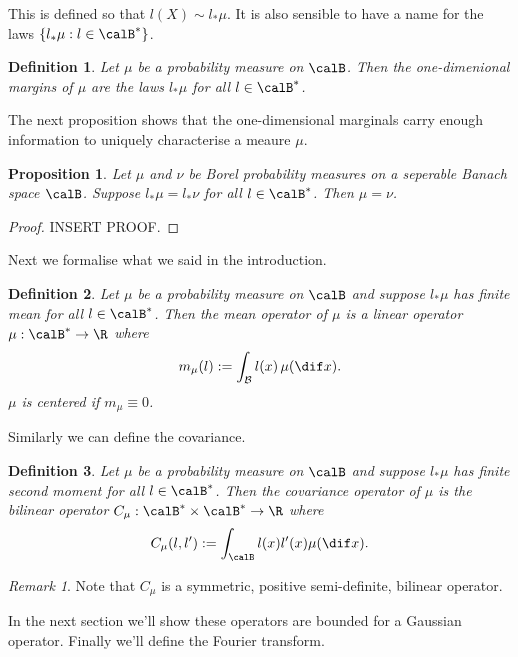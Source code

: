 \documentclass[fontsize=12pt, DIV=10]{scrreprt}
\theoremstyle{mydefn}
\newtheorem{defn}{Definition}
\newtheorem{prop}{Proposition}
\theoremstyle{remark}
\newtheorem{remark}{Remark}
\newcommand{\defeq}{:=}
\begin{document}
This is defined so that $l(X) \sim l_* \mu$. It is also sensible to have a name for the laws $\{l_* \mu : l \in \calB^*\}$.
\begin{defn}
	Let $\mu$ be a probability measure on $\calB$. Then the \emph{one-dimenional margins} of $\mu$ are the laws $l_* \mu$ for all $l \in \calB^*$.
\end{defn}

The next proposition shows that the one-dimensional marginals carry enough information to uniquely characterise a meaure $\mu$.
\begin{prop}
	\label{prop:one-dim-marginals}
	Let $\mu$ and $\nu$ be Borel probability measures on a seperable Banach space $\calB$. Suppose $l_* \mu = l_* \nu$ for all $l \in \calB^*$. Then $\mu = \nu$.
\end{prop}
\begin{proof}
	INSERT PROOF.
\end{proof}

Next we formalise what we said in the introduction.

\begin{defn}
	Let $\mu$ be a probability measure on $\calB$ and suppose $l_* \mu$ has finite mean for all $l \in \calB^*$. Then the \emph{mean operator} of $\mu$ is a linear operator $\mu: \calB^* \to \R$ where
	\begin{equation}
		m_{\mu}(l) \defeq \int_{\cal B} l(x) \, \mu(\dif x).
	\end{equation}
	$\mu$ is \emph{centered} if $m_{\mu} \equiv 0$.
\end{defn}

Similarly we can define the covariance.

\begin{defn}
	Let $\mu$ be a probability measure on $\calB$ and suppose $l_* \mu$ has finite second moment for all $l \in \calB^*$. Then the \emph{covariance operator} of $\mu$ is the bilinear operator $C_{\mu} : \calB^* \times \calB^* \to \R$ where
	\begin{equation}
		C_{\mu}(l, l') \defeq \int_{\calB} l(x) l'(x) \mu(\dif x).
	\end{equation}
\end{defn}
\begin{remark}
	Note that $C_{\mu}$ is a symmetric, positive semi-definite, bilinear operator.
\end{remark}

In the next section we'll show these operators are bounded for a Gaussian operator. Finally we'll define the Fourier transform.
\end{document}
